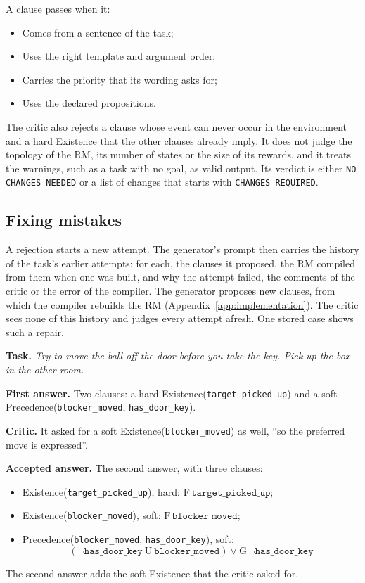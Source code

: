 \documentclass[11pt,english,listoffigures,listoftables]{tfgetsinf}
\begin{document}
\noindent A clause passes when it:
\begin{itemize}
    \item Comes from a sentence of the task;
    \item Uses the right template and argument order;
    \item Carries the priority that its wording asks for;
    \item Uses the declared propositions.
\end{itemize}

\noindent The critic also rejects a clause whose event can never occur in the environment and a hard Existence that the other clauses already imply. It does not judge the topology of the RM, its number of states or the size of its rewards, and it treats the warnings, such as a task with no goal, as valid output. Its verdict is either \texttt{NO CHANGES NEEDED} or a list of changes that starts with \texttt{CHANGES REQUIRED}.

\subsection{Fixing mistakes}
A rejection starts a new attempt. The generator's prompt then carries the history of the task's earlier attempts: for each, the clauses it proposed, the RM compiled from them when one was built, and why the attempt failed, the comments of the critic or the error of the compiler. The generator proposes new clauses, from which the compiler rebuilds the RM (Appendix~\ref{app:implementation}). The critic sees none of this history and judges every attempt afresh. One stored case shows such a repair.

\textbf{Task.} \textit{Try to move the ball off the door before you take the key. Pick up the box in the other room.}

\textbf{First answer.} Two clauses: a hard Existence(\texttt{target\_picked\_up}) and a soft Precedence(\texttt{blocker\_moved}, \texttt{has\_door\_key}).

\textbf{Critic.} It asked for a soft Existence(\texttt{blocker\_moved}) as well, ``so the preferred move is expressed''.

\textbf{Accepted answer.} The second answer, with three clauses:
\begin{itemize}
    \item Existence(\texttt{target\_picked\_up}), hard: $\mathrm{F}\,\texttt{target\_picked\_up}$;
    \item Existence(\texttt{blocker\_moved}), soft: $\mathrm{F}\,\texttt{blocker\_moved}$;
    \item Precedence(\texttt{blocker\_moved}, \texttt{has\_door\_key}), soft:\[(\neg\texttt{has\_door\_key}\ \mathrm{U}\ \texttt{blocker\_moved}) \lor \mathrm{G}\,\neg\texttt{has\_door\_key}\]
\end{itemize}
The second answer adds the soft Existence that the critic asked for.
\end{document}
